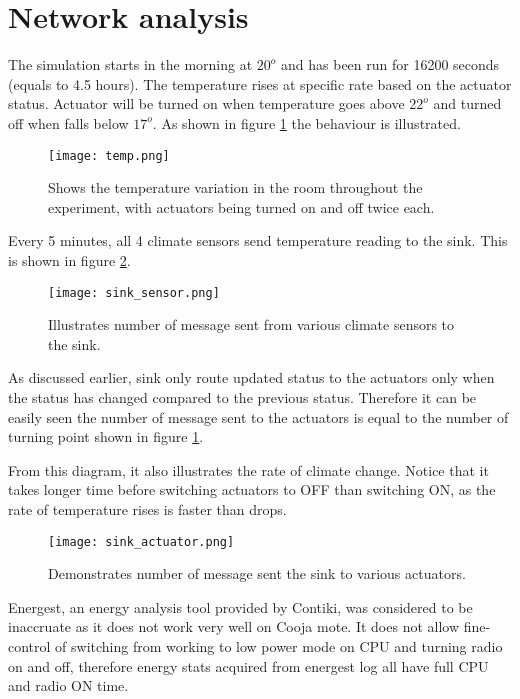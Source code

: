 \documentclass[12pt, oneside, a4paper]{article}
\begin{document}
    \section{Network analysis}

    The simulation starts in the morning at \(20^{o}\) and has been run for 16200 seconds (equals to 4.5 hours). The temperature rises at specific rate based on the actuator status. Actuator will be turned on when temperature goes above \(22^{o}\) and turned off when falls below \(17^{o}\). As shown in figure \ref{temp} the behaviour is illustrated.

    \begin{figure}[H]
        \centering
        \texttt{[image: temp.png]}
        \caption{Shows the temperature variation in the room throughout the experiment, with actuators being turned on and off twice each.}
        \label{temp}
    \end{figure}

    Every 5 minutes, all 4 climate sensors send temperature reading to the sink. This is shown in figure \ref{sensor_sink}.

    \begin{figure}[H]
        \centering
        \texttt{[image: sink\_sensor.png]}
        \caption{Illustrates number of message sent from various climate sensors to the sink.}
        \label{sensor_sink}
    \end{figure}

    As discussed earlier, sink only route updated status to the actuators only when the status has changed compared to the previous status. Therefore it can be easily seen the number of message sent to the actuators is equal to the number of turning point shown in figure \ref{temp}.

    From this diagram, it also illustrates the rate of climate change. Notice that it takes longer time before switching actuators to OFF than switching ON, as the rate of temperature rises is faster than drops.

    \begin{figure}[H]
        \centering
        \texttt{[image: sink\_actuator.png]}
        \caption{Demonstrates number of message sent the sink to various actuators.}
    \end{figure}

    Energest, an energy analysis tool provided by Contiki, was considered to be inaccruate as it does not work very well on Cooja mote. It does not allow fine-control of switching from working to low power mode on CPU and turning radio on and off, therefore energy stats acquired from energest log all have full CPU and radio ON time.
\end{document}
